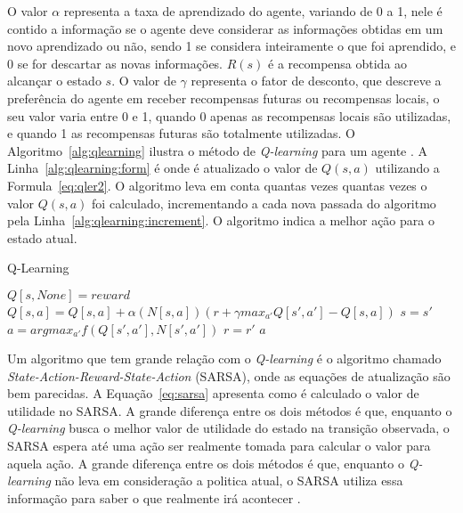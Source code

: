 O valor $\alpha$ representa a taxa de aprendizado do agente, variando de 0 a 1, nele é contido a informação se o agente deve considerar as informações obtidas em um novo aprendizado ou não, sendo 1 se considera inteiramente o que foi aprendido, e 0 se for descartar as novas informações. $R(s)$ é a recompensa obtida ao alcançar o estado $s$. O valor de $\gamma$ representa o fator de desconto, que descreve a preferência do agente em receber recompensas futuras ou recompensas locais, o seu valor varia entre 0 e 1, quando 0 apenas as recompensas locais são utilizadas, e quando 1 as recompensas futuras são totalmente utilizadas. O Algoritmo~\ref{alg:qlearning} ilustra o método de \textit{Q-learning} para um agente \cite{intelligence2003modern}. A Linha~\ref{alg:qlearning:form} é onde é atualizado o valor de $Q(s, a)$ utilizando a Formula~\ref{eq:qler2}. O algoritmo leva em conta quantas vezes quantas vezes o valor $Q(s, a)$ foi calculado, incrementando a cada nova passada do algoritmo pela Linha~\ref{alg:qlearning:increment}. O algoritmo indica a melhor ação para o estado atual.  

\begin{algorithm}
	\caption{Q-Learning}
	\label{alg:qlearning}
	\begin{algorithmic}[1]	
		\State	\Return $Q[s, None] = reward$
		\EndIf
		 \label{alg:qlearning:increment}
		\State $Q[s, a] = Q[s, a] + \alpha(N[s, a]) (r + \gamma max_{a'} Q[s', a'] - Q[s, a])$ \label{alg:qlearning:form}
		\State $s = s'$
		\State $a = argmax_{a'} f(Q[s', a'], N[s', a'])$ \label{alg:qlearning:f}
		\State $r = r'$
		\EndIf	
		\State \Return $a$
		\EndFunction
	\end{algorithmic}
\end{algorithm}


Um algoritmo que tem grande relação com o \textit{Q-learning} é o algoritmo chamado \textit{State-Action-Reward-State-Action} (SARSA), onde as equações de atualização são bem parecidas. A Equação~\ref{eq:sarsa} apresenta como é calculado o valor de utilidade no SARSA. A grande diferença entre os dois métodos é que, enquanto o \textit{Q-learning} busca o melhor valor de utilidade do estado na transição observada, o SARSA espera até uma ação ser realmente tomada para calcular o valor para aquela ação. 
A grande diferença entre os dois métodos é que, enquanto o \textit{Q-learning} não leva em consideração a politica atual, o SARSA utiliza essa informação para saber o que realmente irá acontecer \cite{intelligence2003modern}. 

